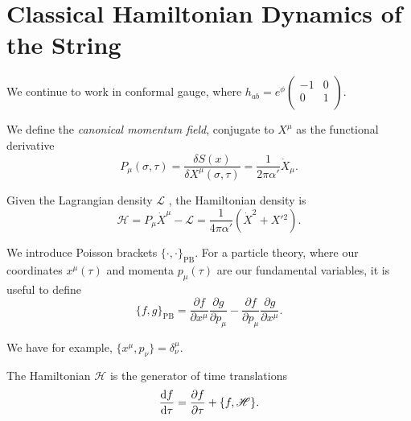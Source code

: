 
\section{Classical Hamiltonian Dynamics of the String}%
\label{sec:classical_hamiltonian_dynamics_of_the_string}

We continue to work in  conformal gauge, where $h_{ab} = e^{\phi}
\begin{pmatrix}
 -1 & 0 \\
 0 & 1 \\
\end{pmatrix} $.
\begin{definition}
  We define the \emph{canonical momentum field}, conjugate to $X^{\mu}$  as the functional derivative
  \begin{equation}
    P_{\mu} (\sigma, \tau) = \frac{\delta S(x)}{\delta X^{\mu}(\sigma, \tau)} = \frac{1}{2 \pi \alpha'} \dot{X}_{\mu}.
  \end{equation}
\end{definition}
\begin{definition}[]
  Given the Lagrangian density $\mathscr{L}$ , the Hamiltonian density is
  \begin{equation}
    \mathscr{H} = P_{\mu} \dot{X}^{\mu} - \mathscr{L} = \frac{1}{4 \pi \alpha'} (\dot{X}^2 + X'{}^2).
  \end{equation}
\end{definition}
\begin{definition}
  We introduce Poisson brackets $\{\cdot, \cdot\}_{\text{PB}}$. For a particle theory, where our coordinates $x^{\mu}(\tau)$  and momenta $p_{\mu} (\tau)$  are our fundamental variables, it is useful to define
  \begin{equation}
    \{f, g\}_{\text{PB}} = \frac{\partial f}{\partial x^{\mu}} \frac{\partial g}{\partial p_{\mu}} - \frac{\partial f}{\partial p_{\mu}} \frac{\partial g}{\partial x^{\mu}}.
  \end{equation}
\end{definition}
\begin{example}[]
  We have for example, $\{x^{\mu}, p_{\nu}\} = \delta^{\mu}_{\nu}$.
\end{example}
The Hamiltonian $\mathscr{H}$  is the generator of time translations
\begin{equation}
  \dv{f}{\tau} = \frac{\partial f}{\partial \tau} + \{f, \mathscr{H}\}.
\end{equation}

